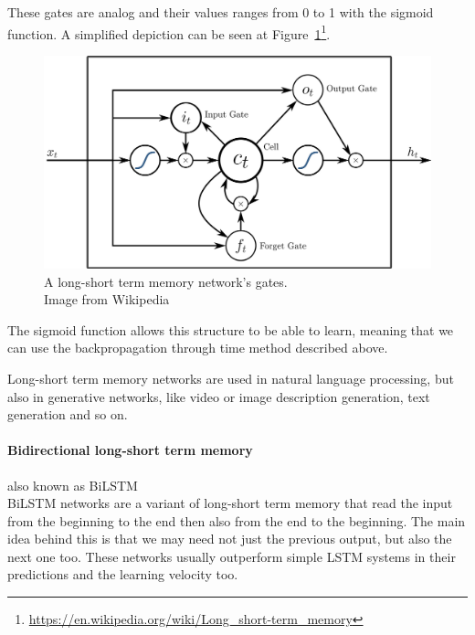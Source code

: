 These gates are analog and their values ranges from 0 to 1 with the sigmoid function. A simplified depiction can be seen at Figure~\ref{fig:lstm}\footnote{\url{https://en.wikipedia.org/wiki/Long_short-term_memory}}.
\begin{figure}[!htb]
	\centering
	\includegraphics[scale=0.2]{lstm.jpg}
	\caption{A long-short term memory network's gates.\\Image from Wikipedia}
	\label{fig:lstm}
\end{figure}
\FloatBarrier

The sigmoid function allows this structure to be able to learn, meaning that we can use the backpropagation through time method described above.

Long-short term memory networks are used in natural language processing, but also in generative networks, like video or image description generation, text generation and so on.

\paragraph*{Bidirectional long-short term memory} also known as BiLSTM\\
BiLSTM networks are a variant of long-short term memory that read the input from the beginning to the end then also from the end to the beginning. The main idea behind this is that we may need not just the previous output, but also the next one too. These networks usually outperform simple LSTM systems in their predictions and the learning velocity too.

